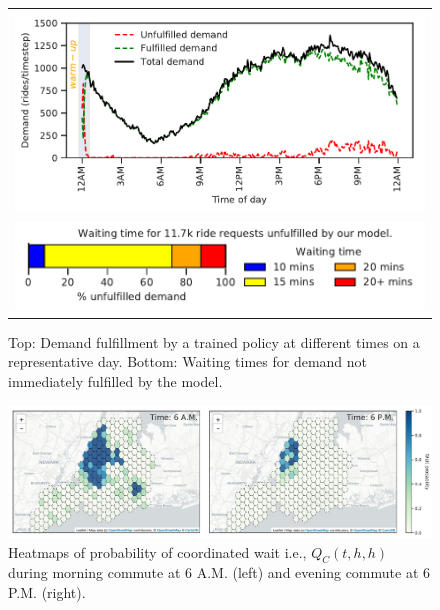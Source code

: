 \begin{figure}[h]
    \centering
    \begin{tabular}{ c }
        \includegraphics[scale=0.5]{figures/model_performance.pdf} \\
        \includegraphics[scale=0.5]{figures/pax_waiting_time.pdf}
    \end{tabular}
    \caption{Top: Demand fulfillment by a trained policy at different times on a representative
        day. Bottom: Waiting times for demand not immediately fulfilled by the model.}
    \label{fig:model_performance}
\end{figure}

\begin{figure}[h]
    \centering
    \includegraphics[width=12cm, height=3.5cm]{figures/wait_probability.pdf}
    \caption{
        Heatmaps of probability of coordinated wait i.e., $Q_C(t, h, h)$ during
        morning commute at 6 A.M. (left) and evening commute at 6 P.M. (right).
        }
    \label{fig:wait_probability}
\end{figure}

